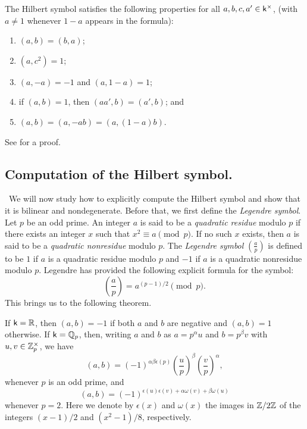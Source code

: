 \begin{theorem}
    The Hilbert symbol satisfies the following properties for all \(a, b, c, a' \in \mathsf{k}^{\times}\), (with \(a \neq 1\) whenever \(1-a\) appears in the formula):

    \smallskip

    \begin{enumerate}[nosep, label=(\alph*)]
        \item \((a, b) = (b, a)\);
        \item \((a, c^2) = 1\);
        \item \((a, -a) = -1\) and \((a, 1-a) = 1\);
        \item if \((a, b) = 1\), then \((aa', b) = (a', b)\); and
        \item \((a, b) = (a, -ab) = (a, (1-a)b)\).\label{item:formula-e}
    \end{enumerate}
\end{theorem}

See \cite[pp.~19--21]{serre2012course} for a proof.

\subsection{Computation of the Hilbert symbol.}~We will now study how to explicitly compute the Hilbert symbol and show that it is bilinear and nondegenerate. Before that, we first define the \emph{Legendre symbol}. Let \(p\) be an odd prime. An integer \(a\) is said to be a \emph{quadratic residue} modulo \(p\) if there exists an integer \(x\) such that \(x^2 \equiv a \pmod{p}\). If no such \(x\) exists, then \(a\) is said to be a \emph{quadratic nonresidue} modulo \(p\). The \emph{Legendre symbol} \(\left(\frac{a}{p}\right)\) is defined to be \(1\) if \(a\) is a quadratic residue modulo \(p\) and \(-1\) if \(a\) is a quadratic nonresidue modulo \(p\). Legendre has provided the following explicit formula for the symbol:\label{sec:computing-hilbert-symbol}
\[
       \left(\frac{a}{p}\right) = a^{(p-1)/2} \pmod{p}.  
\]
This brings us to the following theorem.
\begin{theorem}
    {\normalfont\cite[pp.~20--21]{serre2012course}}
    If \(\mathsf{k} = \mathbb{R}\), then \((a, b) = -1\) if both \(a\) and \(b\) are negative and \((a, b) = 1\) otherwise. If \(\mathsf{k} = \mathbb{Q}_p\), then, writing \(a\) and \(b\) as \(a = p^\alpha u\) and \(b = p^\beta v\) with \(u, v \in \mathbb{Z}_p^{\times}\), we have
    \[
        (a, b) = (-1)^{\alpha\beta\epsilon(p)}\left(\frac{u}{p}\right)^{\beta}\left(\frac{v}{p}\right)^{\alpha},
    \]
    whenever \(p\) is an odd prime, and 
    \[
        (a, b) = (-1)^{\epsilon(u)\epsilon(v) + \alpha\omega(v) + \beta\omega(u)}
    \]
    whenever \(p = 2\). Here we denote by \(\epsilon(x)\) and \(\omega(x)\) the images in \(\mathbb{Z}/2\mathbb{Z}\) of the integers \((x-1)/2\) and \((x^2-1)/8\), respectively.
\end{theorem}

